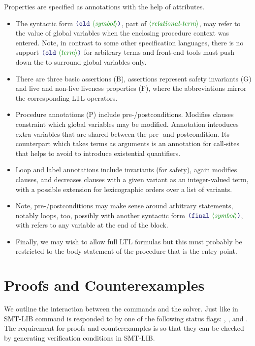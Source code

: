 \documentclass[runningheads]{llncs}
\begin{document}
\noindent
Properties are specified as annotations with the help of attributes.
\begin{itemize}
\item The syntactic form $\LP\terminal{old}~\nonterminal{symbol}\RP$,
      part of $\nonterminal{relational-term}$,
      may refer to the value of global variables
      when the enclosing procedure context was entered.
      Note, in contrast to some other specification languages,
      there is no support $\LP\terminal{old}~\nonterminal{term}\RP$
      for arbitrary terms and front-end tools must push down
      the  to surround global variables only.
\item There are three basic assertions (B), assertions represent safety invariants (G)
      and live and non-live liveness properties (F),
      where the abbreviations mirror the corresponding LTL operators.
\item Procedure annotations (P) include pre-/postconditions.
      Modifies clauses constraint which global variables may be modified.
      Annotation  introduces extra variables that are 
      shared between the pre- and postcondition.
      Its counterpart which takes terms as arguments is an annotation
      for call-sites that helps to avoid to introduce existential quantifiers.
\item Loop and label annotations include invariants (for safety),
      again modifies clauses,
      and decreases clauses with a given variant as an integer-valued term,
      with a possible extension for lexicographic orders
      over a list of variants.
\item Note, pre-/postconditions may make sense around arbitrary statements,
      notably loops,
      too, possibly with another syntactic form $\LP\terminal{final}~\nonterminal{symbol}\RP$,
      with refers to any variable at the end of the block.
\item Finally, we may wish to allow full LTL formulas
      but this must probably be restricted to the body statement
      of the procedure that is the entry point.
\end{itemize}

\section{Proofs and Counterexamples}

We outline the interaction between the commands and the solver.
Just like in SMT-LIB  command is responded
to by one of the following status flags:
, , and .
The requirement for proofs and counterexamples is so that
they can be checked by generating verification conditions in SMT-LIB.
\end{document}
